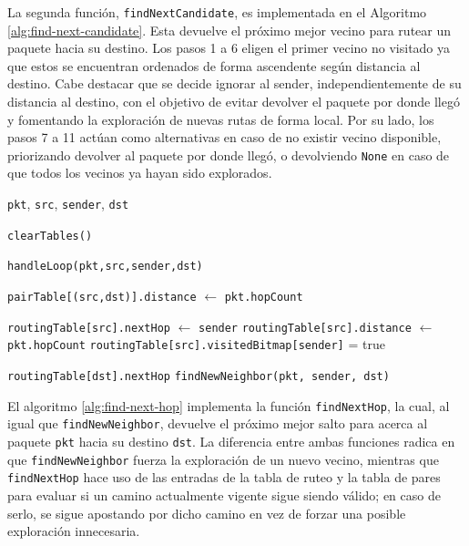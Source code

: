La segunda función, \texttt{findNextCandidate}, es implementada en el Algoritmo \ref{alg:find-next-candidate}. Esta devuelve el próximo mejor vecino para rutear un paquete hacia su destino. Los pasos 1 a 6 eligen el primer vecino no visitado ya que estos se encuentran ordenados de forma ascendente según distancia al destino. Cabe destacar que se decide ignorar al sender, independientemente de su distancia al destino, con el objetivo de evitar devolver el paquete por donde llegó y fomentando la exploración de nuevas rutas de forma local. Por su lado, los pasos 7 a 11 actúan como alternativas en caso de no existir vecino disponible, priorizando devolver al paquete por donde llegó, o devolviendo \texttt{None} en caso de que todos los vecinos ya hayan sido explorados.

\begin{algorithm}
\caption{\texttt{findNextHop}}
\label{alg:find-next-hop}
\begin{algorithmic}[1]
\Require \texttt{pkt}, \texttt{src}, \texttt{sender}, \texttt{dst}

    \State \texttt{clearTables()}
\EndIf

    \State \Return \texttt{handleLoop(pkt,src,sender,dst)}
\EndIf

\State \texttt{pairTable[(src,dst)].distance} $\gets$ \texttt{pkt.hopCount}

    \State \texttt{routingTable[src].nextHop} $\gets$ \texttt{sender}
    \State \texttt{routingTable[src].distance} $\gets$ \texttt{pkt.hopCount}
    \State \texttt{routingTable[src].visitedBitmap[sender]} = true
\EndIf

    \State \Return \texttt{routingTable[dst].nextHop}
\EndIf
\State \Return \texttt{findNewNeighbor(pkt, sender, dst)}
\end{algorithmic}
\end{algorithm}

El algoritmo \ref{alg:find-next-hop} implementa la función \texttt{findNextHop}, la cual, al igual que \texttt{findNewNeighbor}, devuelve el próximo mejor salto para acerca al paquete \texttt{pkt} hacia su destino \texttt{dst}. La diferencia entre ambas funciones radica en que \texttt{findNewNeighbor} fuerza la exploración de un nuevo vecino, mientras que \texttt{findNextHop} hace uso de las entradas de la tabla de ruteo y la tabla de pares para evaluar si un camino actualmente vigente sigue siendo válido; en caso de serlo, se sigue apostando por dicho camino en vez de forzar una posible exploración innecesaria.

